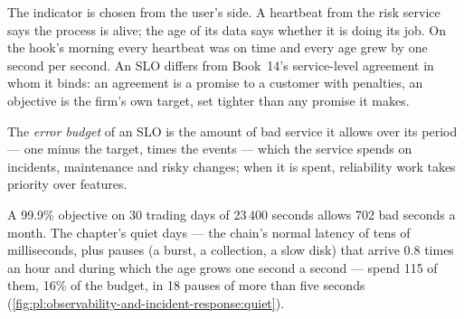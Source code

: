 The indicator is chosen from the user's side. A heartbeat from the risk service says the process is alive; the age of its data says whether it
is doing its job. On the hook's morning every heartbeat was on time and every age grew by one second per second. An SLO differs from Book~14's
service-level agreement in whom it binds: an agreement is a promise to a customer with penalties, an objective is the firm's own target,
set tighter than any promise it makes.

\begin{definition}\label{def:pl:observability-and-incident-response:budget}
The \emph{error budget} of an SLO is the amount of bad service it allows over its period --- one minus the target, times the
events --- which the service spends on incidents, maintenance and risky changes; when it is spent, reliability work takes priority over
features.
\end{definition}

A 99.9\% objective on 30 trading days of 23\,400 seconds allows 702 bad seconds a month. The chapter's quiet days --- the chain's normal
latency of tens of milliseconds, plus pauses (a burst, a collection, a slow disk) that arrive 0.8 times an hour and during which the age grows
one second a second --- spend 115 of them, 16\% of the budget, in 18 pauses of more than five seconds
(\cref{fig:pl:observability-and-incident-response:quiet}).

\begin{omfigure}

\label{fig:pl:observability-and-incident-response:quiet}
\end{omfigure}

